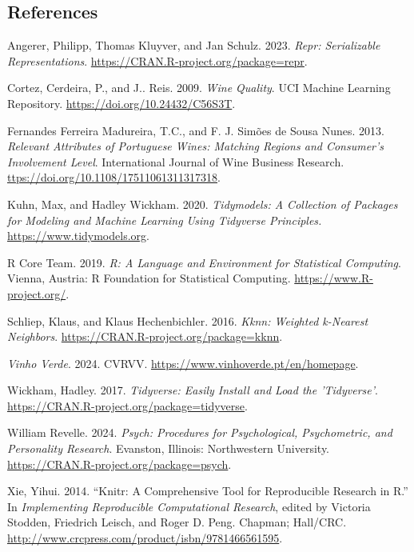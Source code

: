 \documentclass[
  letterpaper,
  DIV=11,
  numbers=noendperiod]{scrartcl}
\newlength{\cslhangindent}
\newenvironment{CSLReferences}[2] %
 {\begin{list}{}{%
  \setlength{\itemindent}{0pt}
  \setlength{\leftmargin}{0pt}
  \setlength{\parsep}{0pt}
  \ifodd #1
   \setlength{\leftmargin}{\cslhangindent}
   \setlength{\itemindent}{-1\cslhangindent}
  \fi
  \setlength{\itemsep}{#2\baselineskip}}}
 {\end{list}}
\begin{document}
\subsection*{References}\label{references}

\label{refs}
\begin{CSLReferences}{1}{0}
Angerer, Philipp, Thomas Kluyver, and Jan Schulz. 2023. \emph{Repr:
Serializable Representations}.
\url{https://CRAN.R-project.org/package=repr}.

Cortez, Cerdeira, P., and J.. Reis. 2009. \emph{Wine Quality}. UCI
Machine Learning Repository. \url{https://doi.org/10.24432/C56S3T}.

Fernandes Ferreira Madureira, T.C., and F. J. Simões de Sousa Nunes.
2013. \emph{Relevant Attributes of Portuguese Wines: Matching Regions
and Consumer's Involvement Level}. International Journal of Wine
Business Research. \url{ttps://doi.org/10.1108/17511061311317318}.

Kuhn, Max, and Hadley Wickham. 2020. \emph{Tidymodels: A Collection of
Packages for Modeling and Machine Learning Using Tidyverse Principles.}
\url{https://www.tidymodels.org}.

R Core Team. 2019. \emph{R: A Language and Environment for Statistical
Computing}. Vienna, Austria: R Foundation for Statistical Computing.
\url{https://www.R-project.org/}.

Schliep, Klaus, and Klaus Hechenbichler. 2016. \emph{Kknn: Weighted
k-Nearest Neighbors}. \url{https://CRAN.R-project.org/package=kknn}.

\emph{Vinho Verde}. 2024. CVRVV.
\url{https://www.vinhoverde.pt/en/homepage}.

Wickham, Hadley. 2017. \emph{Tidyverse: Easily Install and Load the
'Tidyverse'}. \url{https://CRAN.R-project.org/package=tidyverse}.

William Revelle. 2024. \emph{Psych: Procedures for Psychological,
Psychometric, and Personality Research}. Evanston, Illinois:
Northwestern University. \url{https://CRAN.R-project.org/package=psych}.

Xie, Yihui. 2014. {``Knitr: A Comprehensive Tool for Reproducible
Research in {R}.''} In \emph{Implementing Reproducible Computational
Research}, edited by Victoria Stodden, Friedrich Leisch, and Roger D.
Peng. Chapman; Hall/CRC.
\url{http://www.crcpress.com/product/isbn/9781466561595}.

\end{CSLReferences}
\end{document}
